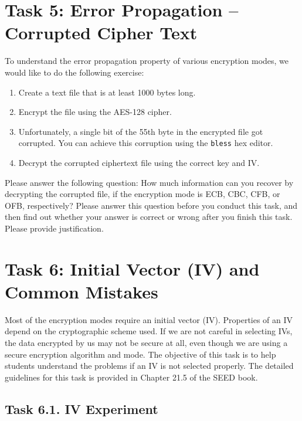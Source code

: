 \section{Task 5: Error Propagation -- Corrupted Cipher Text} 


To understand the error propagation property of various encryption modes, we would like to
do the following exercise:

\begin{enumerate}
\item Create a text file that is at least 1000 bytes long.  
\item Encrypt the file using the AES-128 cipher.
\item Unfortunately, a single bit of the 55th byte in the encrypted 
      file got corrupted. You can achieve this corruption using 
      the \texttt{bless} hex editor.
\item Decrypt the corrupted ciphertext file using the correct key and IV.
\end{enumerate}

Please answer the following question: 
How much information can you recover by decrypting the corrupted file, if the 
encryption mode is ECB, CBC, CFB, or OFB, respectively? Please answer this 
question before you conduct this task, and then find out whether your answer
is correct or wrong after you finish this task. 
Please provide justification.





\section{Task 6: Initial Vector (IV) and Common Mistakes}

Most of the encryption modes require an initial vector (IV). Properties of an IV depend 
on the cryptographic scheme used. If we are not careful in selecting IVs,
the data encrypted by us may not be secure at all, even though we are using 
a secure encryption algorithm and mode. The objective of this task is to
help students understand the problems if an IV is not selected properly. 
The detailed guidelines for this task is provided in 
Chapter 21.5 of the SEED book.


\subsection{Task 6.1. IV Experiment} 

